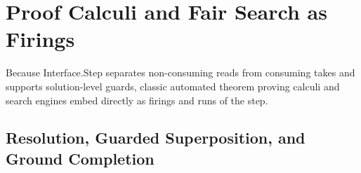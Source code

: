 \documentclass[11pt,a4paper]{article}
\theoremstyle{definition}
\DeclareRobustCommand{\lean}[1]{%
  \ifmmode\text{\normalfont\ttfamily\footnotesize\detokenize{#1}}%
  \else{\normalfont\footnotesize\leanurl{#1}}\fi}
\def\lean#1{#1}%
\begin{document}
\section{Proof Calculi and Fair Search as Firings}
\label{sec:atp}

Because \lean{Interface.Step} separates non-consuming reads from consuming takes and supports solution-level guards, classic automated theorem proving calculi and search engines embed directly as firings and runs of the step.

\subsection{Resolution, Guarded Superposition, and Ground Completion}
\end{document}
